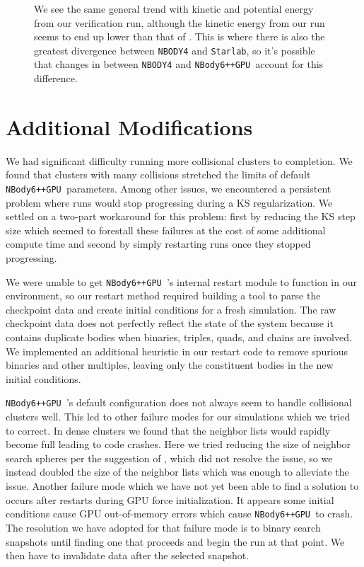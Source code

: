 \documentclass{princeton_astro_thesis}
\newcommand\nbody{\texttt{NBody6++GPU }}
\numberwithin{equation}{section}
\begin{document}
\begin{figure}
    \caption{We see the same general trend with kinetic and potential energy from our verification run, although the kinetic energy from our run seems to end up lower than that of \citet{2009Anders}.  This is where there is also the greatest divergence between \texttt{NBODY4} and \texttt{Starlab}, so it's possible that changes in between \texttt{NBODY4} and \nbody account for this difference.}
    \label{fig:verifications2}
\end{figure}


\section{Additional Modifications}
We had significant difficulty running more collisional clusters to completion.  We found that clusters with many collisions stretched the limits of default \nbody parameters.  Among other issues, we encountered a persistent problem where runs would stop progressing during a KS regularization.  We settled on a two-part workaround for this problem: first by reducing the KS step size which seemed to forestall these failures at the cost of some additional compute time and second by simply restarting runs once they stopped progressing. 

We were unable to get \nbody's internal restart module to function in our environment, so our restart method required building a tool to parse the checkpoint data and create initial conditions for a fresh simulation.  The raw checkpoint data does not perfectly reflect the state of the system because it contains duplicate bodies when binaries, triples, quads, and chains are involved. We implemented an additional heuristic in our restart code to remove spurious binaries and other multiples, leaving only the constituent bodies in the new initial conditions.

\nbody's default configuration does not always seem to handle collisional clusters well. This led to other failure modes for our simulations which we tried to correct. In dense clusters we found that the neighbor lists would rapidly become full leading to code crashes.  Here we tried reducing the size of neighbor search spheres per the suggestion of \citet[][personal communication]{2017Wang}, which did not resolve the issue, so we instead doubled the size of the neighbor lists which was enough to alleviate the issue. Another failure mode which we have not yet been able to find a solution to occurs after restarts during GPU force initialization. It appears some initial conditions cause GPU out-of-memory errors which cause \nbody to crash. The resolution we have adopted for that failure mode is to binary search snapshots until finding one that proceeds and begin the run at that point.  We then have to invalidate data after the selected snapshot.
\end{document}
